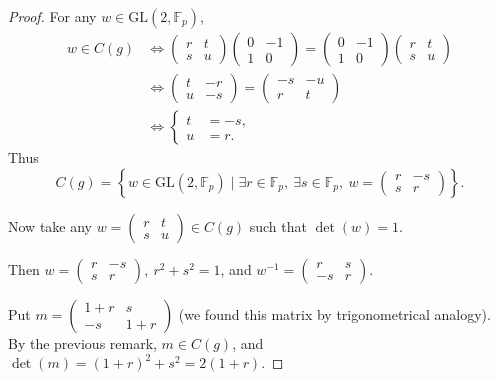 \documentclass[11pt,a4paper]{article}
\newcommand{\F}{\mathbb{F}}
\begin{document}
{\begin{proof}
For any $w \in \mathrm{GL}(2,\F_p)$,
\begin{align*}
w \in C(g) &\iff \begin{pmatrix} r & t\\s & u \end{pmatrix}\begin{pmatrix} 0 & -1\\1 & 0 \end{pmatrix}  = \begin{pmatrix} 0 & -1\\1 & 0 \end{pmatrix} \begin{pmatrix} r & t\\s & u \end{pmatrix}\\
&\iff \begin{pmatrix} t & -r\\ u & -s\end{pmatrix} =\begin{pmatrix}  -s & -u\\ r & t\end{pmatrix}\\
&\iff
\left\{
\begin{array}{ll}
t &= -s,\\
u &=r.
\end{array}
\right.
\end{align*}
Thus
$$C(g) = \left\{ w \in \mathrm{GL}(2,\F_p) \mid \exists r \in \F_p,\ \exists s \in \F_p,\  w = \begin{pmatrix} r & -s\\s & r \end{pmatrix} \right\}.$$

Now take any $w = \begin{pmatrix} r & t\\s & u \end{pmatrix} \in C(g)$ such that $\det(w) = 1$. 

Then  $w = \begin{pmatrix} r & -s\\s & r \end{pmatrix} , \ r^2 + s^2 = 1$, and $w^{-1} =  \begin{pmatrix} r & s\\-s & r \end{pmatrix}$.

Put $m = \begin{pmatrix} 1+r & s\\- s & 1+r \end{pmatrix}$ (we found this matrix by trigonometrical analogy). By the previous remark, $m\in C(g)$, and $\det(m) = (1+r)^2 +s^2 = 2(1+r)$.


\end{proof}}
\end{document}
